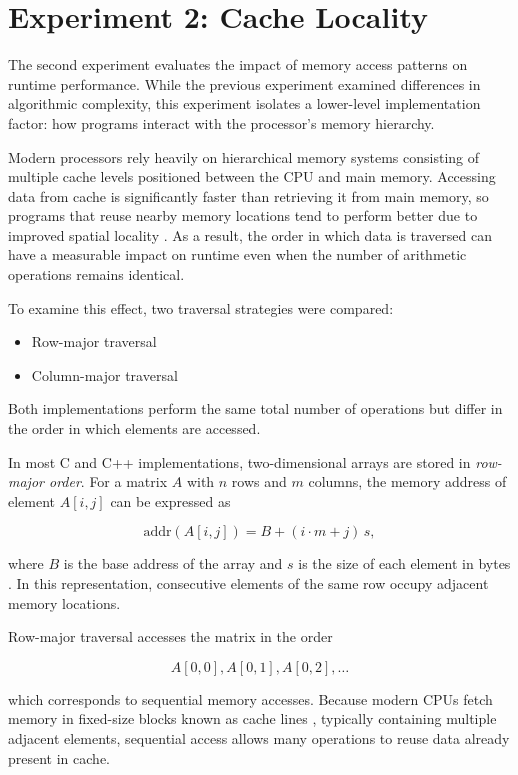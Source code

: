 \section{Experiment 2: Cache Locality}

The second experiment evaluates the impact of memory access patterns on runtime performance. While the previous experiment examined differences in algorithmic complexity, this experiment isolates a lower-level implementation factor: how programs interact with the processor's memory hierarchy.

Modern processors rely heavily on hierarchical memory systems consisting of multiple cache levels positioned between the CPU and main memory. Accessing data from cache is significantly faster than retrieving it from main memory, so programs that reuse nearby memory locations tend to perform better due to improved spatial locality \cite{lam1991, mckee2004, hennessy2019}. As a result, the order in which data is traversed can have a measurable impact on runtime even when the number of arithmetic operations remains identical.

To examine this effect, two traversal strategies were compared:

\begin{itemize}
\item Row-major traversal
\item Column-major traversal
\end{itemize}

Both implementations perform the same total number of operations but differ in the order in which elements are accessed.

In most C and C++ implementations, two-dimensional arrays are stored in \textit{row-major order}. For a matrix \(A\) with \(n\) rows and \(m\) columns, the memory address of element \(A[i,j]\) can be expressed as

\[
\text{addr}(A[i,j]) = B + (i \cdot m + j)\,s,
\]

where \(B\) is the base address of the array and \(s\) is the size of each element in bytes \cite{hennessy2019}. In this representation, consecutive elements of the same row occupy adjacent memory locations.

Row-major traversal accesses the matrix in the order

\[
A[0,0], A[0,1], A[0,2], \dots
\]

which corresponds to sequential memory accesses. Because modern CPUs fetch memory in fixed-size blocks known as cache lines \cite{hennessy2019}, typically containing multiple adjacent elements, sequential access allows many operations to reuse data already present in cache.

